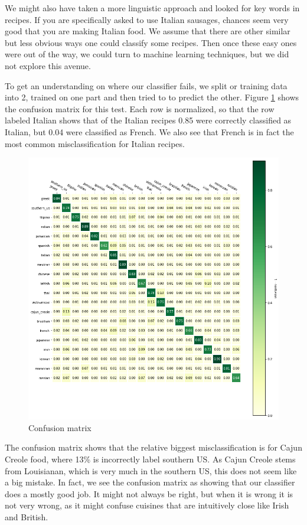 \documentclass[parskip=half]{scrartcl}
\theoremstyle{definition}
\theoremstyle{remark}
\begin{document}
We might also have taken a more linguistic approach and looked for key words in recipes. 
If you are specifically asked to use Italian sausages, chances seem very good that you are making Italian food. 
We assume that there are other similar but less obvious ways one could classify some recipes.
Then once these easy ones were out of the way, we could turn to machine learning techniques, but we did not explore this avenue.     

To get an understanding on where our classifier fails, we split or training data into 2, trained on one part and then tried to to predict the other.
Figure \ref{fig:confusion} shows the confusion matrix for this test.
Each row is normalized, so that the row labeled Italian shows that of the Italian recipes 0.85 were correctly classified as Italian, but 0.04 were classified as French. 
We also see that French is in fact the most common misclassification for Italian recipes. 

\begin{figure}
\caption{Confusion matrix} \label{fig:confusion}
\centering
\includegraphics[scale=0.6]{images/confusion.png}
\end{figure}

The confusion matrix shows that the relative biggest misclassification is for Cajun Creole food, where 13\% is incorrectly label southern US. 
As Cajun Creole stems from Louisianan, which is very much in the southern US, this does not seem like a big mistake. 
In fact, we see the confusion matrix as showing that our classifier does a mostly good job.
It might not always be right, but when it is wrong it is not very wrong, as it might confuse cuisines that are intuitively close like Irish and British. 
 
\end{document}
